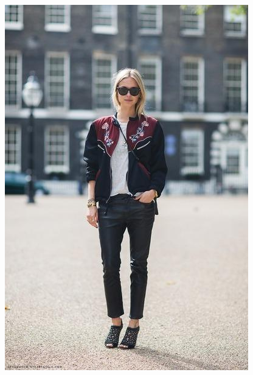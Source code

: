 \documentclass[12pt]{report}
\begin{document}
\begin{figure}
  \centering
  \begin{minipage}[b]{0.3\textwidth}
    \includegraphics[width=\textwidth]{images/resultados/1060077original.jpg}
    \caption{}
  \end{minipage}
  \hfill
  \begin{minipage}[b]{0.3\textwidth}

\end{minipage}
\end{figure}
\end{document}
